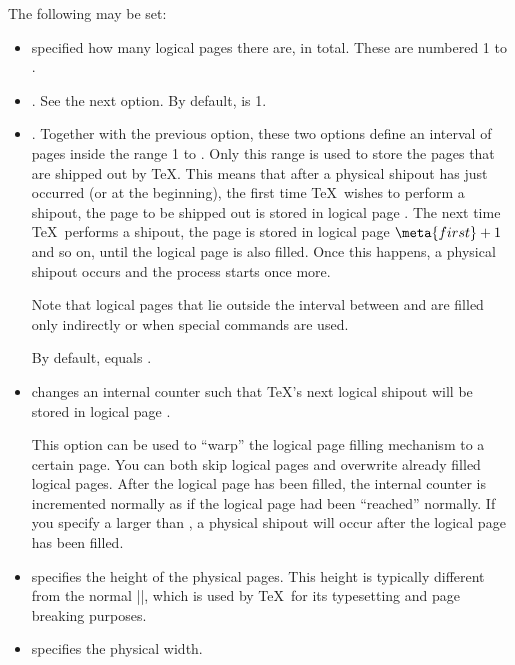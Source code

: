 \begin{command}{\pgfpagesphysicalpageoptions{}}
    The following  may be set:
    \begin{itemize}
        \item {} specified how many
            logical pages there are, in total. These are numbered 1 to
            .
        \item {}. See the next
            option. By default,  is 1.
        \item {}. Together with the
            previous option, these two options define an interval of pages
            inside the range 1 to . Only this range is used
            to store the pages that are shipped out by \TeX. This means that
            after a physical shipout has just occurred (or at the beginning),
            the first time \TeX\ wishes to perform a shipout, the page to be
            shipped out is stored in logical page . The next time
            \TeX\ performs a shipout, the page is stored in logical page
            $\meta{first} +1$ and so on, until the logical page  is
            also filled. Once this happens, a physical shipout occurs and the
            process starts once more.

            Note that logical pages that lie outside the interval between
             and  are filled only indirectly or when
            special commands are used.

            By default,  equals .
        \item {} changes an
            internal counter such that \TeX's next logical shipout will be
            stored in logical page .

            This option can be used to ``warp'' the logical page filling
            mechanism to a certain page. You can both skip logical pages and
            overwrite already filled logical pages. After the logical page
             has been filled, the internal counter is incremented
            normally as if the logical page  had been ``reached''
            normally. If you specify a  larger than ,
            a physical shipout will occur after the logical page 
            has been filled.
        \item {} specifies the height of
            the physical pages. This height is typically different from the
            normal  |\paperheight|, which is used by \TeX\ for its typesetting
            and page breaking purposes.
        \item {} specifies the physical
            width.
    \end{itemize}
\end{command}


